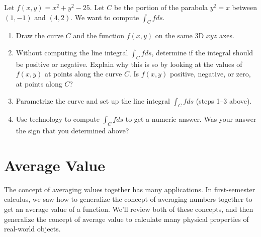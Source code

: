 

\begin{problem}
 Let $f(x,y)=x^2+y^2-25$. Let $C$ be the portion of the parabola $y^2=x$ between $(1,-1)$ and $(4,2)$. We want to compute $\int_C fds$.  
\begin{enumerate}
\item Draw the curve $C$ and the function $f(x,y)$ on the same 3D $xyz$ axes.
 \item Without computing the line integral $\int_C fds$, determine if the integral should be positive or negative. Explain why this is so by looking at the values of $f(x,y)$ at points along the curve $C$.  Is $f(x,y)$ positive, negative, or zero, at points along $C$?
 \item Parametrize the curve and set up the line integral $\int_C f ds$ (steps 1--3 above).
 \item Use technology to compute $\int_C fds$ to get a numeric answer.  Was your answer the sign that you determined above?
\end{enumerate}
\end{problem}

\section{Average Value}

The concept of averaging values together has many applications.  In first-semester calculus, we saw how to generalize the concept of averaging numbers together to get an average value of a function.  We'll review both of these concepts, and then generalize the concept of average value to calculate many physical properties of real-world objects.

